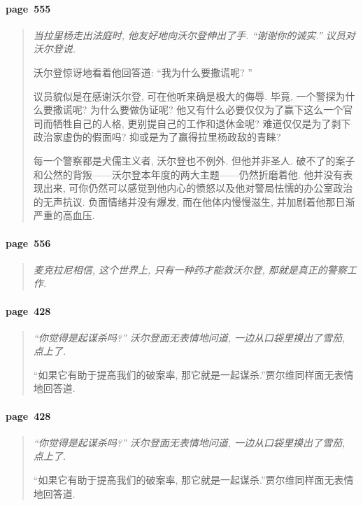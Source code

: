 \paragraph*{page~555}
\begin{quotation}
    \itshape
    当拉里杨走出法庭时, 他友好地向沃尔登伸出了手. ``谢谢你的诚实.'' 议员对沃尔登说.

    沃尔登惊讶地看着他回答道: ``我为什么要撒谎呢? ''

    议员貌似是在感谢沃尔登, 可在他听来确是极大的侮辱. 毕竟, 一个警探为什么要撒谎呢? 为什么要做伪证呢? 他又有什么必要仅仅为了赢下这么一个官司而牺牲自己的人格, 更别提自己的工作和退休金呢? 难道仅仅是为了剥下政治家虚伪的假面吗? 抑或是为了赢得拉里杨政敌的青睐?

    每一个警察都是犬儒主义者, 沃尔登也不例外. 但他并非圣人. 破不了的案子和公然的背叛------沃尔登本年度的两大主题------仍然折磨着他. 他并没有表现出来, 可你仍然可以感觉到他内心的愤怒以及他对警局怯懦的办公室政治的无声抗议. 负面情绪并没有爆发, 而在他体内慢慢滋生, 并加剧着他那日渐严重的高血压. 
\end{quotation}

\paragraph*{page~556}
\begin{quotation}
    \itshape
    麦克拉尼相信, 这个世界上, 只有一种药才能救沃尔登, 那就是真正的警察工作. 
\end{quotation}

\paragraph*{page~428}
\begin{quotation}
    \itshape
    ``你觉得是起谋杀吗?'' 沃尔登面无表情地问道, 一边从口袋里摸出了雪茄, 点上了. 

    ``如果它有助于提高我们的破案率, 那它就是一起谋杀.''贾尔维同样面无表情地回答道. 
\end{quotation}

\paragraph*{page~428}
\begin{quotation}
    \itshape
    ``你觉得是起谋杀吗?'' 沃尔登面无表情地问道, 一边从口袋里摸出了雪茄, 点上了. 

    ``如果它有助于提高我们的破案率, 那它就是一起谋杀.''贾尔维同样面无表情地回答道. 
\end{quotation}

